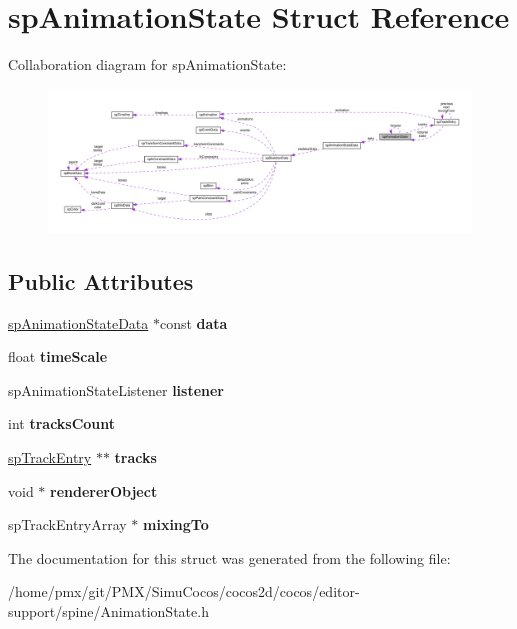 \hypertarget{structspAnimationState}{}\section{sp\+Animation\+State Struct Reference}
\label{structspAnimationState}


Collaboration diagram for sp\+Animation\+State\+:
\nopagebreak
\begin{figure}[H]
\begin{center}
\leavevmode
\includegraphics[width=350pt]{structspAnimationState__coll__graph}
\end{center}
\end{figure}
\subsection*{Public Attributes}
\begin{DoxyCompactItemize}
\item 
\mbox{\label{structspAnimationState_a17bb82f149448c0349f318284433d2c7}} 
\hyperlink{structspAnimationStateData}{sp\+Animation\+State\+Data} $\ast$const {\bfseries data}
\item 
\mbox{\label{structspAnimationState_ad9a192b872ef5c64a02c297ca08f067c}} 
float {\bfseries time\+Scale}
\item 
\mbox{\label{structspAnimationState_a70eb4a893bd95c44b4964f604a5e8b9b}} 
sp\+Animation\+State\+Listener {\bfseries listener}
\item 
\mbox{\label{structspAnimationState_aacc8a438fe42c94bf573b44943f7fb66}} 
int {\bfseries tracks\+Count}
\item 
\mbox{\label{structspAnimationState_a66f0c3e7f71ad62bdebc180ea31d39cb}} 
\hyperlink{structspTrackEntry}{sp\+Track\+Entry} $\ast$$\ast$ {\bfseries tracks}
\item 
\mbox{\label{structspAnimationState_a07161a925423216cdcd0f35c451b1e6f}} 
void $\ast$ {\bfseries renderer\+Object}
\item 
\mbox{\label{structspAnimationState_ab7b839d99e676541eea6402a5441673b}} 
sp\+Track\+Entry\+Array $\ast$ {\bfseries mixing\+To}
\end{DoxyCompactItemize}


The documentation for this struct was generated from the following file\+:\begin{DoxyCompactItemize}
\item 
/home/pmx/git/\+P\+M\+X/\+Simu\+Cocos/cocos2d/cocos/editor-\/support/spine/Animation\+State.\+h\end{DoxyCompactItemize}
